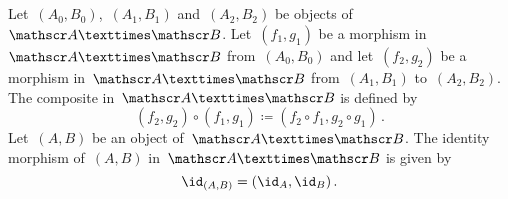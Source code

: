 \subsection{}

Let~$(A_0, B_0)$,~$(A_1, B_1)$ and~$(A_2, B_2)$ be objects of~$\Acat × \Bcat$.
Let~$(f_1, g_1)$ be a morphism in~$\Acat × \Bcat$ from~$(A_0, B_0)$ and let~$(f_2, g_2)$ be a morphism in~$\Acat × \Bcat$ from~$(A_1, B_1)$ to~$(A_2, B_2)$.
The composite in~$\Acat × \Bcat$ is defined by
\[
	(f_2, g_2) ∘ (f_1, g_1)
	≔
	(f_2 ∘ f_1, g_2 ∘ g_1) \,.
\]
Let~$(A, B)$ be an object of~$\Acat × \Bcat$.
The identity morphism of~$(A, B)$ in~$\Acat × \Bcat$ is given by
\[
	\id_{(A, B)}
	=
	(\id_A, \id_B) \,.
\]
